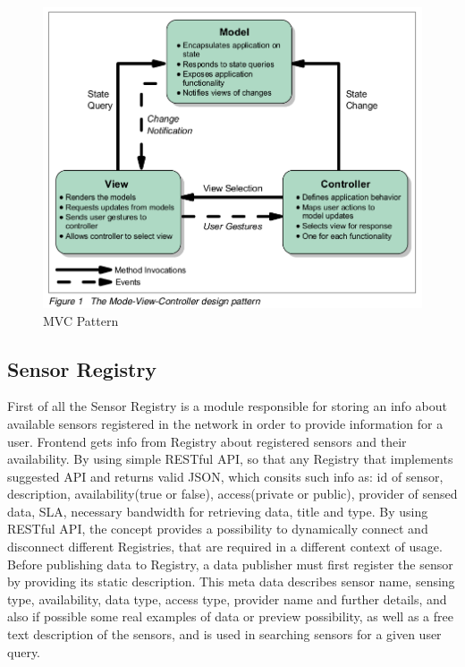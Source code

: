      \begin{figure}[!ht]
     \centering
     \includegraphics[scale=0.7]{images/MVCPattern.png}   
     \caption[MVC Pattern]{MVC Pattern }
     \label{img:MVCPattern}                           
     \end{figure}

	\subsection{Sensor Registry}
    First of all the Sensor Registry is a module responsible for storing an info about available sensors registered in the network in order to provide information for a user. Frontend gets info from Registry about registered sensors and their availability. By using simple RESTful API, so that any Registry that implements suggested API and returns valid JSON, which consits such info as: id of sensor, description, availability(true or false), access(private or public), provider of sensed data, SLA, necessary bandwidth for retrieving data, title and type. By using RESTful API, the concept provides a possibility to dynamically connect and disconnect different Registries, that are required in a different context of usage. 
    Before publishing data to Registry, a data publisher must first register the sensor by providing its static description. This meta data describes sensor name, sensing type, availability, data type, access type, provider name and further details, and also if possible some real examples of data or preview possibility, as well as a free text description of the sensors, and is used in searching sensors for a given user query. 

